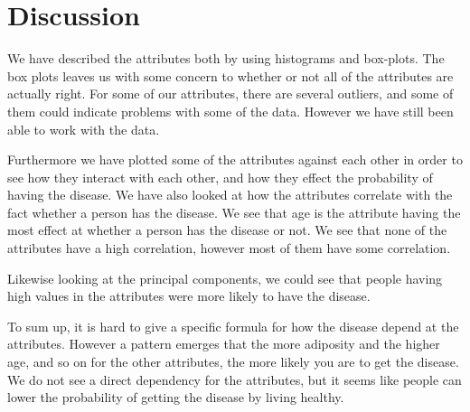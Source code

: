 \section{Discussion}
We have described the attributes both by using histograms and box-plots. The box plots leaves us with some concern to whether or not all of the attributes are actually right. For some of our attributes, there are several outliers, and some of them could indicate problems with some of the data. However we have still been able to work with the data.

Furthermore we have plotted some of the attributes against each other in order to see how they interact with each other, and how they effect the probability of having the disease. We have also looked at how the attributes correlate with the fact whether a person has the disease. We see that age is the attribute having the most effect at whether a person has the disease or not. We see that none of the attributes have a high correlation, however most of them have some correlation.

Likewise looking at the principal components, we could see that people having high values in the attributes were more likely to have the disease.

To sum up, it is hard to give a specific formula for how the disease depend at the attributes. However a pattern emerges that the more adiposity and the higher age, and so on for the other attributes, the more likely you are to get the disease. We do not see a direct dependency for the attributes, but it seems like people can lower the probability of getting the disease by living healthy.